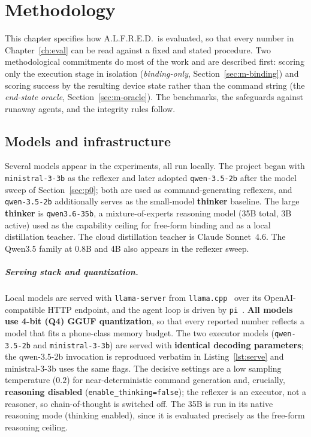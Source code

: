 \chapter{Methodology}
\label{ch:method}

This chapter specifies how A.L.F.R.E.D.\ is evaluated, so that every number in
Chapter~\ref{ch:eval} can be read against a fixed and stated procedure. Two
methodological commitments do most of the work and are described first: scoring
only the execution stage in isolation (\emph{binding-only},
Section~\ref{sec:m-binding}) and scoring success by the resulting device state
rather than the command string (the \emph{end-state oracle},
Section~\ref{sec:m-oracle}). The benchmarks, the safeguards against runaway
agents, and the integrity rules follow.

\section{Models and infrastructure}
\label{sec:m-models}

Several models appear in the experiments, all run locally. The project began with
\texttt{ministral-3-3b} as the reflexer and later adopted \texttt{qwen-3.5-2b}
after the model sweep of Section~\ref{sec:p0}; both are used as command-generating
reflexers, and \texttt{qwen-3.5-2b} additionally serves as the small-model
\textbf{thinker} baseline. The large \textbf{thinker} is \texttt{qwen3.6-35b}, a
mixture-of-experts reasoning model (35B total, 3B active) used as the capability
ceiling for free-form binding and as a local distillation teacher. The cloud
distillation teacher is Claude Sonnet~4.6. The Qwen3.5 family at 0.8B and 4B also
appears in the reflexer sweep.

\paragraph{Serving stack and quantization.} Local models are served with
\texttt{llama-server} from \texttt{llama.cpp}~\citep{llamacpp} over its
OpenAI-compatible HTTP endpoint, and the agent loop is driven by
\texttt{pi}~\citep{pi-agent}. \textbf{All models use 4-bit (Q4) GGUF
quantization}, so that every reported number reflects a model that fits a
phone-class memory budget. The two executor models (\texttt{qwen-3.5-2b} and
\texttt{ministral-3-3b}) are served with \textbf{identical decoding parameters};
the qwen-3.5-2b invocation is reproduced verbatim in Listing~\ref{lst:serve} and
ministral-3-3b uses the same flags. The decisive settings are a low sampling
temperature ($0.2$) for near-deterministic command generation and, crucially,
\textbf{reasoning disabled} (\texttt{enable\_thinking=false}); the reflexer is an
executor, not a reasoner, so chain-of-thought is switched off. The 35B is run in
its native reasoning mode (thinking enabled), since it is evaluated precisely as
the free-form reasoning ceiling.


